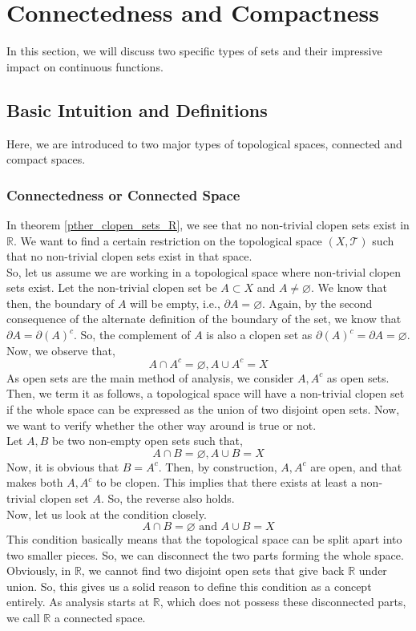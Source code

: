 \section{Connectedness and Compactness}
In this section, we will discuss two specific types of sets and their impressive impact on continuous functions.
\subsection{Basic Intuition and Definitions}
Here, we are introduced to two major types of topological spaces, connected and compact spaces.
\subsubsection{Connectedness or Connected Space}
In theorem \eqref{pther_clopen_sets_R}, we see that no non-trivial clopen sets exist in $\mathbb{R}$. We want to find a certain restriction on the topological space $(X,\mathcal{T})$ such that no non-trivial clopen sets exist in that space.\\
So, let us assume we are working in a topological space where non-trivial clopen sets exist. Let the non-trivial clopen set be $A\subset X$ and $A\neq\varnothing$. We know that then, the boundary of $A$ will be empty, i.e., $\partial A=\varnothing$. Again, by the second consequence of the alternate definition of the boundary of the set, we know that $\partial A=\partial(A)^c$. So, the complement of $A$ is also a clopen set as $\partial(A)^c=\partial A=\varnothing$. Now, we observe that, $$A\cap A^c=\varnothing,A\cup A^c=X$$ 
As open sets are the main method of analysis, we consider $A, A^c$ as open sets. Then, we term it as follows, a topological space will have a non-trivial clopen set if the whole space can be expressed as the union of two disjoint open sets. Now, we want to verify whether the other way around is true or not.\\
Let $A, B$ be two non-empty open sets such that, $$A\cap B=\varnothing, A\cup B=X$$
Now, it is obvious that $B=A^c$. Then, by construction, $A, A^c$ are open, and that makes both $A, A^c$ to be clopen. This implies that there exists at least a non-trivial clopen set $A$. So, the reverse also holds.\\
Now, let us look at the condition closely.
$$A\cap B=\varnothing\text{ and } A\cup B=X$$
This condition basically means that the topological space can be split apart into two smaller pieces. So, we can disconnect the two parts forming the whole space. Obviously, in $\mathbb{R}$, we cannot find two disjoint open sets that give back $\mathbb{R}$ under union. So, this gives us a solid reason to define this condition as a concept entirely. As analysis starts at $\mathbb{R}$, which does not possess these disconnected parts, we call $\mathbb{R}$ a connected space.
